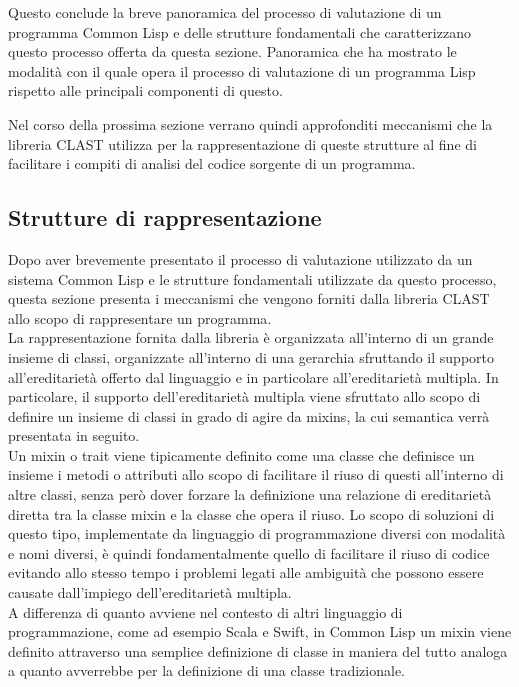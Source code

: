 Questo conclude la breve panoramica del processo di valutazione di un
programma Common Lisp e delle strutture fondamentali che caratterizzano questo
processo offerta da questa sezione. Panoramica che ha mostrato le modalità con
il quale opera il processo di valutazione di un programma Lisp rispetto alle
principali componenti di questo.

Nel corso della prossima sezione verrano quindi approfonditi meccanismi che la
libreria CLAST utilizza per la rappresentazione di queste strutture al fine di
facilitare i compiti di analisi del codice sorgente di un programma.

\subsection{Strutture di rappresentazione}

Dopo aver brevemente presentato il processo di valutazione utilizzato da un
sistema Common Lisp e le strutture fondamentali utilizzate da questo processo,
questa sezione presenta i meccanismi che vengono forniti dalla libreria CLAST
allo scopo di rappresentare un programma.\\

La rappresentazione fornita dalla libreria è organizzata all’interno di un
grande insieme di classi, organizzate all’interno di una gerarchia sfruttando
il supporto all’ereditarietà offerto dal linguaggio e in particolare
all’ereditarietà multipla. In particolare, il supporto dell’ereditarietà
multipla viene sfruttato allo scopo di definire un insieme di classi in grado
di agire da mixins, la cui semantica verrà presentata in seguito.\\

Un mixin o trait viene tipicamente definito come una classe che definisce un
insieme i metodi o attributi allo scopo di facilitare il riuso di questi
all’interno di altre classi, senza però dover forzare la definizione una
relazione di ereditarietà diretta tra la classe mixin e la classe che opera il
riuso. Lo scopo di soluzioni di questo tipo, implementate da linguaggio di
programmazione diversi con modalità e nomi diversi, è quindi fondamentalmente
quello di facilitare il riuso di codice evitando allo stesso tempo i problemi
legati alle ambiguità che possono essere causate dall’impiego
dell’ereditarietà multipla.\\

A differenza di quanto avviene nel contesto di altri linguaggio di
programmazione, come ad esempio Scala e Swift, in Common Lisp un mixin viene
definito attraverso una semplice definizione di classe in maniera del tutto
analoga a quanto avverrebbe per la definizione di una classe tradizionale.\\

